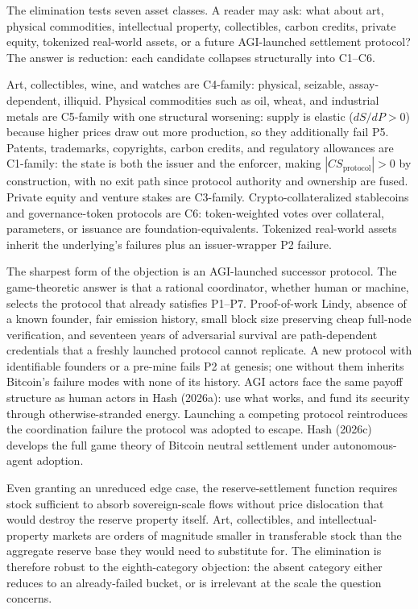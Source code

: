 \documentclass[12pt]{article}
\theoremstyle{definition}
\theoremstyle{remark}
\begin{document}
The elimination tests seven asset classes. A reader may ask: what about
art, physical commodities, intellectual property, collectibles, carbon
credits, private equity, tokenized real-world assets, or a future
AGI-launched settlement protocol? The answer is reduction: each
candidate collapses structurally into C1--C6.

Art, collectibles, wine, and watches are C4-family: physical, seizable,
assay-dependent, illiquid. Physical commodities such as oil, wheat, and
industrial metals are C5-family with one structural worsening: supply
is elastic ($dS/dP > 0$) because higher prices draw out more
production, so they additionally fail P5. Patents, trademarks,
copyrights, carbon credits, and regulatory allowances are C1-family:
the state is both the issuer and the enforcer, making
$|CS_\text{protocol}| > 0$ by construction, with no exit path since
protocol authority and ownership are fused. Private equity and venture stakes are C3-family.
Crypto-collateralized stablecoins and governance-token protocols are
C6: token-weighted votes over collateral, parameters, or issuance are
foundation-equivalents. Tokenized real-world assets inherit the
underlying's failures plus an issuer-wrapper P2 failure.

The sharpest form of the objection is an AGI-launched successor
protocol. The game-theoretic answer is that a rational coordinator,
whether human or machine, selects the protocol that already satisfies
P1--P7. Proof-of-work Lindy, absence of a known founder, fair emission
history, small block size preserving cheap full-node verification, and
seventeen years of adversarial survival are path-dependent credentials
that a freshly launched protocol cannot replicate. A new protocol with
identifiable founders or a pre-mine fails P2 at genesis; one without
them inherits Bitcoin's failure modes with none of its history. AGI
actors face the same payoff structure as human actors in Hash (2026a):
use what works, and fund its security through otherwise-stranded
energy. Launching a competing protocol reintroduces the coordination
failure the protocol was adopted to escape. Hash (2026c) develops the
full game theory of Bitcoin neutral settlement under autonomous-agent
adoption.

Even granting an unreduced edge case, the reserve-settlement function
requires stock sufficient to absorb sovereign-scale flows without
price dislocation that would destroy the reserve property itself. Art,
collectibles, and intellectual-property markets are orders of magnitude
smaller in transferable stock than the aggregate reserve base they
would need to substitute for. The elimination is therefore robust to
the eighth-category objection: the absent category either reduces to
an already-failed bucket, or is irrelevant at the scale the question
concerns.
\end{document}
